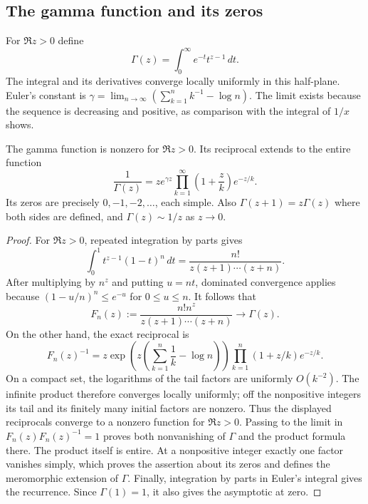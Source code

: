 \subsection{The gamma function and its zeros}

For $\Re z>0$ define
\[
 \Gamma(z)=\int_0^\infty e^{-t}t^{z-1}\,dt.
\]
The integral and its derivatives converge locally uniformly in this
half-plane. Euler's constant is
$\gamma=\lim_{n\to\infty}(\sum_{k=1}^n k^{-1}-\log n)$.
The limit exists because the sequence is decreasing and positive, as
comparison with the integral of $1/x$ shows.

\begin{lemma}\label{tools:gamma}
The gamma function is nonzero for $\Re z>0$. Its reciprocal extends
to the entire function
\begin{equation}\label{tools:gamma-product}
 \frac1{\Gamma(z)}
   =ze^{\gamma z}\prod_{k=1}^{\infty}
        \left(1+\frac zk\right)e^{-z/k}.
\end{equation}
Its zeros are precisely $0,-1,-2,\ldots$, each simple.
Also $\Gamma(z+1)=z\Gamma(z)$ where both sides are defined, and
$\Gamma(z)\sim1/z$ as $z\to0$.
\end{lemma}
\begin{proof}
For $\Re z>0$, repeated integration by parts gives
\[
 \int_0^1 t^{z-1}(1-t)^n\,dt
  =\frac{n!}{z(z+1)\cdots(z+n)}.
\]
After multiplying by $n^z$ and putting $u=nt$, dominated convergence
applies because $(1-u/n)^n\leq e^{-u}$ for $0\leq u\leq n$.
It follows that
\[
 F_n(z):=\frac{n!n^z}{z(z+1)\cdots(z+n)}\longrightarrow\Gamma(z).
\]
On the other hand, the exact reciprocal is
\[
 F_n(z)^{-1}
  =z\exp\left(z\left(\sum_{k=1}^n\frac1k-\log n\right)\right)
       \prod_{k=1}^n(1+z/k)e^{-z/k}.
\]
On a compact set, the logarithms of the tail factors are uniformly
$O(k^{-2})$. The infinite product therefore converges locally uniformly;
off the nonpositive integers its tail and its finitely many initial
factors are nonzero. Thus the displayed reciprocals converge to a
nonzero function for $\Re z>0$. Passing to the limit in
$F_n(z)F_n(z)^{-1}=1$ proves both nonvanishing of $\Gamma$ and the
product formula there. The product itself is entire. At a nonpositive
integer exactly one factor vanishes simply, which proves the assertion
about its zeros and defines the meromorphic extension of $\Gamma$.
Finally, integration by parts in Euler's integral gives the recurrence.
Since $\Gamma(1)=1$, it also gives the asymptotic at zero.
\end{proof}
